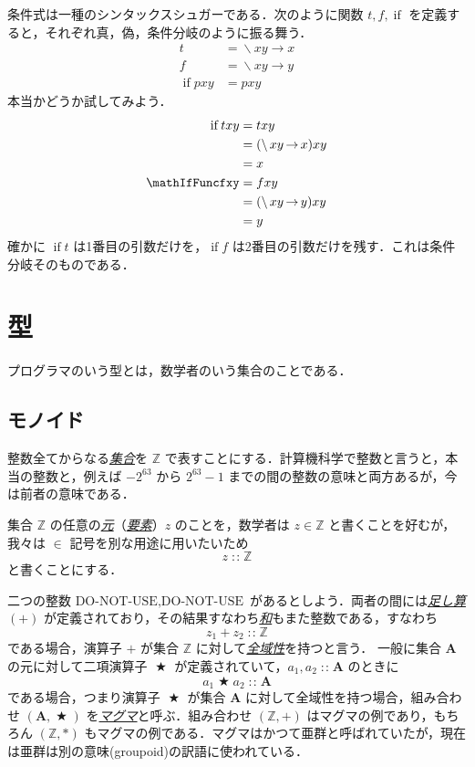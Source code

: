 \documentclass[a4paper]{jsbook}
\newenvironment{leader}{\begingroup}{\endgroup}
\newcommand{\keyword}[1]{{\underline{\emph{#1}}}}
\newcommand{\mVar}[1]{\text{DO-NOT-USE}}
\newcommand{\mSet}[1]{\mathbf{#1}}
\newcommand{\mSpecialSet}[1]{\mathbb{#1}} %
\newcommand{\mZSet}{\mSpecialSet{Z}}
\newcommand{\mTupleWith}[1]{\left(#1\right)}
\DeclareMathOperator{\mIfFunc}{if}
\DeclareMathOperator{\mLambda}{\backslash}
\DeclareMathOperator{\mLambdaArrow}{\rightarrow}
\DeclareMathOperator{\mIn}{{:\!:}}
\DeclareMathOperator{\mBinOp}{\bigstar}
\newcommand{\mLambdaExp}[2]{\mLambda{#1}\mLambdaArrow{#2}}
\DeclareMathOperator{\mathIfFunc}{if}
\begin{document}
条件式は一種のシンタックスシュガーである．次のように関数 $t,f,\mIfFunc$ を定義すると，それぞれ真，偽，条件分岐のように振る舞う．
\begin{align}
t&=\mLambdaExp{xy}{x}\\
f&=\mLambdaExp{xy}{y}\\
\mathIfFunc pxy&=pxy
\end{align}
本当かどうか試してみよう．
\begin{align}
\mathIfFunc txy&=txy\\
&=(\mLambdaExp{xy}{x})xy\\
&=x\\
\mathIfFuncfxy&=fxy\\
&=(\mLambdaExp{xy}{y})xy\\
&=y
\end{align}
確かに $\mIfFunc t$ は1番目の引数だけを，$\mIfFunc f$ は2番目の引数だけを残す．これは条件分岐そのものである．


\chapter{型}

\begin{leader}
プログラマのいう型とは，数学者のいう集合のことである．
\end{leader}

\section{モノイド}

整数全てからなる\keyword{集合}を $\mZSet$ で表すことにする．計算機科学で整数と言うと，本当の整数と，例えば $-2^{63}$ から $2^{63}-1$ までの間の整数の意味と両方あるが，今は前者の意味である．

集合 $\mZSet$ の任意の\keyword{元}（\keyword{要素}）$z$ のことを，数学者は $z\in\mZSet$ と書くことを好むが，我々は $\in$ 記号を別な用途に用いたいため
\begin{equation}
\label{eq:totality}
z\mIn\mZSet
\end{equation}
と書くことにする．

二つの整数 $\mVar{z_1},\mVar{z_2}$ があるとしよう．両者の間には\keyword{足し算} $(+)$ が定義されており，その結果すなわち\keyword{和}もまた整数である，すなわち
\begin{equation}
z_1+z_2\mIn\mZSet
\end{equation}
である場合，演算子 $+$ が集合 $\mZSet$ に対して\keyword{全域性}を持つと言う．
一般に集合 $\mSet{A}$ の元に対して二項演算子 $\mBinOp$ が定義されていて，$a_1,a_2\mIn\mSet{A}$ のときに
\begin{equation}
\label{eq:totality}
a_1\mBinOp a_2\mIn\mSet{A}
\end{equation}
である場合，つまり演算子 $\mBinOp$ が集合 $\mSet{A}$ に対して全域性を持つ場合，組み合わせ $\mTupleWith{\mSet{A},\mBinOp}$ を\keyword{マグマ}と呼ぶ．組み合わせ $\mTupleWith{\mZSet,+}$ はマグマの例であり，もちろん $\mTupleWith{\mZSet,*}$ もマグマの例である．マグマはかつて亜群と呼ばれていたが，現在は亜群は別の意味(groupoid)の訳語に使われている．
\end{document}

